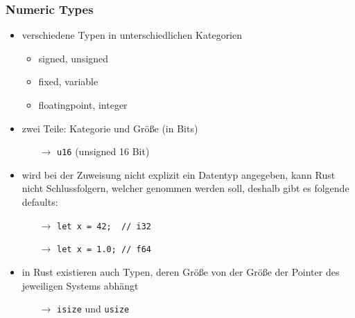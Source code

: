 \documentclass[a4paper,12pt]{article}
\begin{document}
\subsubsection{Numeric Types}
	\begin{itemize}
	  \item verschiedene Typen in unterschiedlichen Kategorien
	  \begin{itemize}
	    \item signed, unsigned
	    \item fixed, variable
	    \item floatingpoint, integer
	  \end{itemize}
	  \item zwei Teile: Kategorie und Größe (in Bits)
	  \begin{itemize}
	      \item[$\rightarrow$] \verb|u16| (unsigned 16 Bit)
	  \end{itemize}
	  \item wird bei der Zuweisung nicht explizit ein Datentyp angegeben, kann Rust nicht Schlussfolgern, welcher genommen werden soll, deshalb gibt es folgende defaults:
	  \begin{itemize}
	      \item[$\rightarrow$] \verb|let x = 42;  // i32| 
	      \item[$\rightarrow$] \verb|let x = 1.0; // f64|
	  \end{itemize}
	  \item in Rust existieren auch Typen, deren Größe von der Größe der Pointer des jeweiligen Systems abhängt
	  \begin{itemize}
	      \item[$\rightarrow$] \verb|isize| und \verb|usize| 
	  \end{itemize}
	\end{itemize}
	
\end{document}
